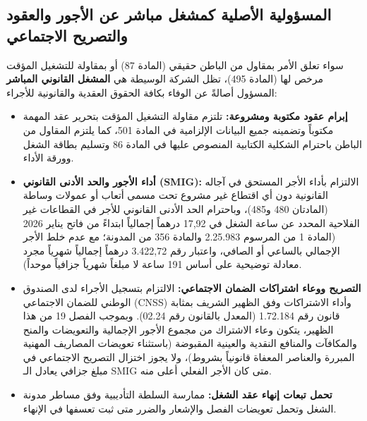 \subsection{المسؤولية الأصلية كمشغل مباشر عن الأجور والعقود والتصريح الاجتماعي}
سواء تعلق الأمر بمقاول من الباطن حقيقي (المادة \textenglish{87}) أو بمقاولة للتشغيل المؤقت مرخص لها (المادة \textenglish{495})، تظل الشركة الوسيطة هي \textbf{المشغل القانوني المباشر} المسؤول أصالةً عن الوفاء بكافة الحقوق العقدية والقانونية للأجراء:
\begin{itemize}[leftmargin=*, itemsep=5pt]
    \item \textbf{إبرام عقود مكتوبة ومشروعة:} تلتزم مقاولة التشغيل المؤقت بتحرير عقد المهمة مكتوباً وتضمينه جميع البيانات الإلزامية في المادة \textenglish{501}، كما يلتزم المقاول من الباطن باحترام الشكلية الكتابية المنصوص عليها في المادة \textenglish{86} وتسليم بطاقة الشغل وورقة الأداء.
    \item \textbf{أداء الأجور والحد الأدنى القانوني (\textenglish{SMIG}):} الالتزام بأداء الأجر المستحق في آجاله القانونية دون أي اقتطاع غير مشروع تحت مسمى أتعاب أو عمولات وساطة (المادتان \textenglish{480} و\textenglish{485})، وباحترام الحد الأدنى القانوني للأجر في القطاعات غير الفلاحية المحدد عن ساعة الشغل في \textenglish{17,92} درهماً إجمالياً ابتداءً من فاتح يناير \textenglish{2026} (المادة \textenglish{1} من المرسوم \textenglish{2.25.983} والمادة \textenglish{356} من المدونة؛ مع عدم خلط الأجر الإجمالي بالساعي أو الصافي، واعتبار رقم \textenglish{3.422,72} درهماً إجمالياً شهرياً مجرد معادلة توضيحية على أساس \textenglish{191} ساعة لا مبلغاً شهرياً جزافياً موحداً).
    \item \textbf{التصريح ووعاء اشتراكات الضمان الاجتماعي:} الالتزام بتسجيل الأجراء لدى الصندوق الوطني للضمان الاجتماعي (\textenglish{CNSS}) وأداء الاشتراكات وفق الظهير الشريف بمثابة قانون رقم \textenglish{1.72.184} (المعدل بالقانون رقم \textenglish{02.24}). وبموجب الفصل \textenglish{19} من هذا الظهير، يتكون وعاء الاشتراك من مجموع الأجور الإجمالية والتعويضات والمنح والمكافآت والمنافع النقدية والعينية المقبوضة (باستثناء تعويضات المصاريف المهنية المبررة والعناصر المعفاة قانونياً بشروط)، ولا يجوز اختزال التصريح الاجتماعي في مبلغ جزافي يعادل الـ \textenglish{SMIG} متى كان الأجر الفعلي أعلى منه.
    \item \textbf{تحمل تبعات إنهاء عقد الشغل:} ممارسة السلطة التأديبية وفق مساطر مدونة الشغل وتحمل تعويضات الفصل والإشعار والضرر متى ثبت تعسفها في الإنهاء.
\end{itemize}

